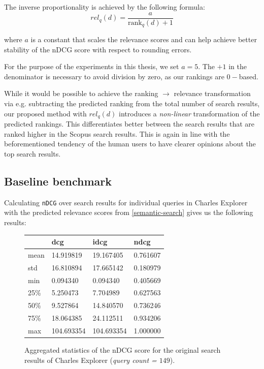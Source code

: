 The inverse proportionality is achieved by the following formula:
\[rel_q(d) = \frac{a}{\text{rank}_q(d) + 1}\]

where $a$ is a constant that scales the relevance scores and can help achieve better 
stability of the nDCG score with respect to rounding errors.

For the purpose of the experiments in this thesis, we set $a = 5$. 
The $+1$ in the denominator is necessary to avoid division by zero, as our rankings are $0-$based.

While it would be possible to achieve the ranking $\rightarrow$ relevance transformation via e.g. subtracting the predicted ranking from the total number of search results, 
our proposed method with $rel_q(d)$ introduces a \textit{non-linear} transformation of the predicted rankings. 
This differentiates better between the search results that are ranked higher in the Scopus search results. 
This is again in line with the beforementioned tendency of the human users to have clearer opinions about the top search results.

\subsection{Baseline benchmark}

Calculating \texttt{nDCG} over search results for individual queries in
Charles Explorer with the predicted relevance scores from \ref{semantic-search} gives us the following results:

\begin{figure}[!ht]
    \captionsetup{width=.9\linewidth}
    \centering
    \begin{tabular}{|l|l|l|l|}
    \hline
        ~ & dcg & idcg & ndcg \\ \hline
        mean & 14.919819 & 19.167405 & 0.761607 \\ \hline
        std & 16.810894 & 17.665142 & 0.180979 \\ \hline
        min & 0.094340 & 0.094340 & 0.405669 \\ \hline
        25\% & 5.250473 & 7.704989 & 0.627563 \\ \hline
        50\% & 9.527864 & 14.840570 & 0.736246 \\ \hline
        75\% & 18.064385 & 24.112511 & 0.934206 \\ \hline
        max & 104.693354 & 104.693354 & 1.000000 \\ \hline
    \end{tabular}
    \caption{Aggregated statistics of the nDCG score for the original search results of Charles Explorer (\textit{query count = $149$}).}
\end{figure}

